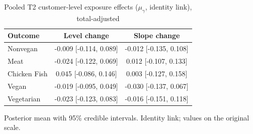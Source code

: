\begin{table}[H]
\centering
\caption{Pooled T2 customer-level exposure effects ($\mu_\gamma$, identity link), total-adjusted}
\label{tab:a5_t2_mu_gamma_adj}
\begin{tabular}{lcc}
\toprule
Outcome & Level change & Slope change \\
\midrule
Nonvegan & -0.009 [-0.114, 0.089] & -0.012 [-0.135, 0.108] \\
Meat & -0.024 [-0.122, 0.069] & 0.012 [-0.107, 0.133] \\
Chicken Fish & 0.045 [-0.086, 0.146] & 0.003 [-0.127, 0.158] \\
Vegan & -0.019 [-0.095, 0.049] & -0.030 [-0.137, 0.067] \\
Vegetarian & -0.023 [-0.123, 0.083] & -0.016 [-0.151, 0.118] \\
\bottomrule
\end{tabular}
\par\smallskip\footnotesize Posterior mean with 95\% credible intervals. Identity link; values on the original scale.
\end{table}
